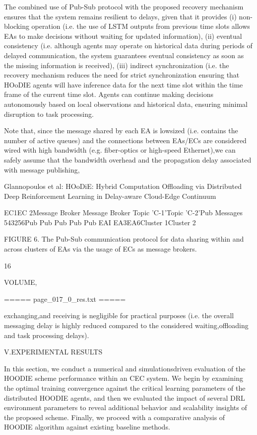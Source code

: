 \documentclass{article}
\begin{document}
The combined use of Pub-Sub protocol with the proposed recovery mechanism ensures that the system remains resilient to delays, given that it provides (i) non-blocking operation (i.e. the use of LSTM outputs from previous time slots allows EAs to make decisions without waiting for updated information), (ii) eventual consistency (i.e. although agents may operate on historical data during periods of delayed communication, the system guarantees eventual consistency as soon as the missing information is received), (iii) indirect synchronization (i.e. the recovery mechanism reduces the need for strict synchronization ensuring that HOoDIE agents will have inference data for the next time slot within the time frame of the current time slot. Agents can continue making decisions autonomously based on local observations and historical data, ensuring minimal disruption to task processing.

Note that, since the message shared by each EA is lowsized (i.e. contains the number of active queues) and the connections between EAs/ECs are considered wired with high bandwidth (e.g. fiber-optics or high-speed Ethernet),we can safely assume that the bandwidth overhead and the propagation delay associated with message publishing,

Glannopoulos et al: HOoDiE: Hybrid Computation Offloading via Distributed Deep Reinforcement Learning in Delay-aware Cloud-Edge Continuum

EC1EC 2Message Broker Message Broker Topic 'C-1'Topic 'C-2'Pub Messages 543256Pub Pub Pub Pub Pub EAI EA3EA6Cluster 1Cluster 2

FIGURE 6. The Pub-Sub communication protocol for data sharing within and across clusters of EAs via the usage of ECs as message brokers.

16

VOLUME,

===== page\_017\_0\_res.txt =====


exchanging,and receiving is negligible for practical purposes (i.e. the overall messaging delay is highly reduced compared to the considered waiting,offloading and task processing delays).

V.EXPERIMENTAL RESULTS

In this section, we conduct a numerical and simulationsdriven evaluation of the HOODIE scheme performance within an CEC system. We begin by examining the optimal training convergence against the critical learning parameters of the distributed HOODIE agents, and then we evaluated the impact of several DRL environment parameters to reveal additional behavior and scalability insights of the proposed scheme. Finally, we proceed with a comparative analysis of HOODIE algorithm against existing baseline methods.
\end{document}
